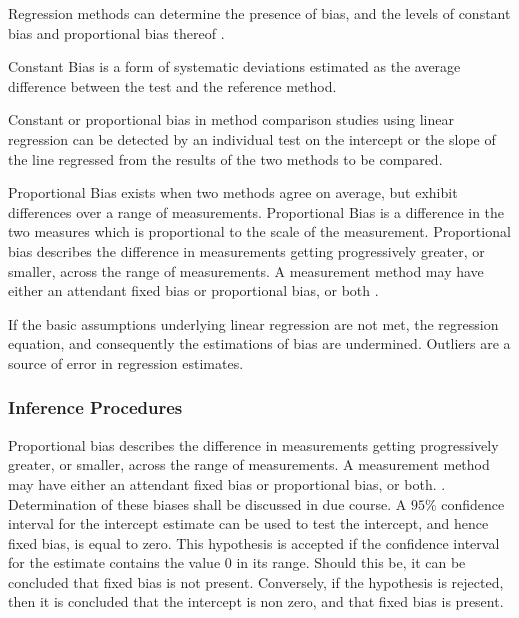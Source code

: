 \documentclass[12pt, a4paper]{report}
\theoremstyle{plain}
\theoremstyle{definition}
\theoremstyle{remark}
\begin{document}
	Regression methods can determine the presence of bias, and the levels of constant bias and proportional bias thereof \cite{ludbrook97,ludbrook02}.
	
	
	Constant Bias is a form of systematic deviations estimated as the average difference between the test and the reference method. 
	
	
	
	
	Constant or proportional bias in method comparison studies using linear regression can be detected by an individual test on the intercept or the slope of the line regressed from the results of the two methods to be compared.
	
	
	Proportional Bias exists when two methods agree on average, but exhibit differences over a range of measurements. Proportional Bias is a difference in the two measures which is proportional to the scale of the measurement.
	Proportional bias describes the difference in measurements getting progressively greater, or smaller, across the range of measurements. A measurement method may have either an attendant fixed bias or proportional bias, or both \citep{ludbrook02}.
	
	If the basic assumptions underlying linear regression are not met, the regression equation, and consequently the estimations of bias are undermined. Outliers are a source of error in regression estimates.
	
	
	\subsubsection{Inference Procedures}
	
	Proportional bias describes the difference in measurements getting progressively greater, or smaller, across the range of measurements. A measurement method may have either an attendant fixed bias or proportional bias, or both. \citep{ludbrook}. Determination of these biases shall be discussed in due course.
	A $95\%$ confidence interval for the intercept estimate can be used to test the intercept, and hence fixed bias, is equal to
	zero. This hypothesis is accepted if the confidence interval for the estimate contains the value $0$ in its range. Should this be,
	it can be concluded that fixed bias is not present. Conversely, if the hypothesis is rejected, then it is concluded that the
	intercept is non zero, and that fixed bias is present.
	
\end{document}
